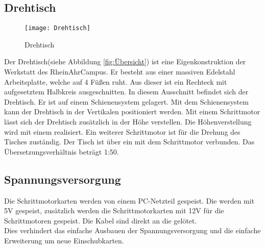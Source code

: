 \subsection{Drehtisch}
\label{sec:Drehtisch}
\begin{figure}[htb]
\centering
\texttt{[image: Drehtisch]}
\caption{Drehtisch}
\label{fig:Drehtisch}
\end{figure}
Der Drehtisch(siehe Abbildung \ref{fig:Übersicht}) ist eine Eigenkonstruktion der Werkstatt des RheinAhrCampus. Er besteht aus einer massiven Edelstahl Arbeitsplatte, welche auf 4 Füßen ruht. Aus dieser ist ein Rechteck mit aufgesetztem Halbkreis ausgeschnitten. In diesem Ausschnitt befindet sich der Drehtisch. Er ist auf einem Schienensystem gelagert. Mit dem Schienensystem kann der Drehtisch in der Vertikalen positioniert werden. Mit einem Schrittmotor lässt sich der Drehtisch zusätzlich in der Höhe verstellen. Die Höhenverstellung wird mit einem  realisiert. Ein weiterer Schrittmotor ist für die Drehung des Tisches zuständig. Der Tisch ist über ein  mit dem Schrittmotor verbunden. Das Übersetzungsverhältnis beträgt 1:50.  
 
\subsection{Spannungsversorgung}
\label{sec:Spannungsv}
Die Schrittmotorkarten werden von einem PC-Netzteil gespeist. Die  werden mit 5V gespeist, zusätzlich werden die Schrittmotorkarten mit 12V für die Schrittmotoren gespeist. Die Kabel sind direkt an die  gelötet.\\
Dies verhindert das einfache Ausbauen der Spannungsversorgung und die einfache Erweiterung um neue Einschubkarten.
